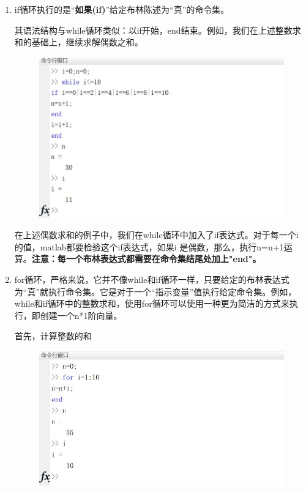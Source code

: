 \documentclass[10pt,math=newtx,citestyle=gb7714-2015,bibstyle=gb7714-2015]{elegantbook}
\begin{document}
{{{\begin{enumerate}
		\item if循环执行的是“\textbf{如果(if)}”给定布林陈述为“真”的命令集。
		
		其语法结构与while循环类似：以if开始，end结束。例如，我们在上述整数求和的基础上，继续求解偶数之和。
		
		\begin{figure}[htbp!]
			\centering
			\includegraphics[width=0.8\linewidth]{FIG/evensum}
			\centering
		\end{figure}
		
		在上述偶数求和的例子中，我们在while循环中加入了if表达式。对于每一个i 的值，matlab都要检验这个if表达式，如果i 是偶数，那么，执行n=n+1运算。\textbf{注意：每一个布林表达式都需要在命令集结尾处加上"end"。}
		
		\item for循环，严格来说，它并不像while和if循环一样，只要给定的布林表达式为“真”就执行命令集。它是对于一个“指示变量”值执行给定命令集。例如，while和if循环中的整数求和，使用for循环可以使用一种更为简洁的方式来执行，即创建一个n*1阶向量。
		
		首先，计算整数的和
		
		\begin{figure}[htbp!]
			\centering
			\includegraphics[width=0.8\linewidth]{FIG/vectorsum}
			\centering
		\end{figure}
	\end{enumerate}
	
}}}
\end{document}
